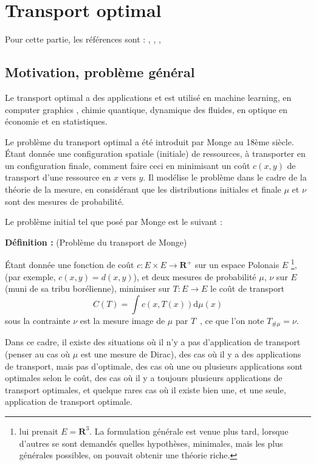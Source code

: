 \documentclass[12pt]{article}
\begin{document}
\section{Transport optimal}

Pour cette partie, les références sont : \cite{ParisEst2022}, \cite{Villani2009}, \cite{Orsay2022}, \cite{DecreusefondMoroz2021}

\subsection{Motivation, problème général}

Le transport optimal a des applications et est utilisé en machine learning, en \og computer graphics \fg, chimie quantique, dynamique des fluides, en optique en économie et en statistiques.

Le problème du transport optimal a été introduit par Monge au 18ème siècle. Étant donnée une configuration spatiale (initiale) de ressources, à transporter en un configuration finale, comment faire ceci en minimisant un coût $c(x,y)$ de transport d'une ressource en $x$ vers $y$. Il modélise le problème dans le cadre de la théorie de la mesure, en considérant que les distributions initiales et finale $ \mu $  et $ \nu $ sont des mesures de probabilité.

Le problème initial tel que posé par Monge est le suivant :

\textbf{Définition :} (Problème du transport de Monge)

Étant donnée une fonction de coût $c : E \times E \to \mathbf R^+ $ sur un espace Polonais $E$ \footnote{lui prenait $ E = \mathbf R^3 $. La formulation générale est venue plus tard, lorsque d'autres se sont demandés quelles hypothèses, minimales, mais les plus générales possibles, on pouvait obtenir une théorie riche.}, (par exemple, $ c(x,y) = d(x,y)$), et deux mesures de probabilité $ \mu $, $ \nu $ sur $E$ (muni de sa tribu borélienne), minimiser sur $T : E \to E $ le coût de transport $$ \displaystyle C(T) = \int c(x,T(x)) \mathrm d \mu(x) $$ sous la contrainte \og $\nu$ est la mesure image de $\mu$ par $T$ \fg \,, ce que l'on note $ T_{\# \mu} = \nu $.

Dans ce cadre, il existe des situations où il n'y a pas d'application de transport (penser au cas où $ \mu $ est une mesure de Dirac), des cas où il y a des applications de transport, mais pas d'optimale, des cas où une ou plusieurs applications sont optimales selon le coût, des cas où il y a toujours plusieurs applications de transport optimales, et quelque rares cas où il existe bien une, et une seule, application de transport optimale.
\end{document}
